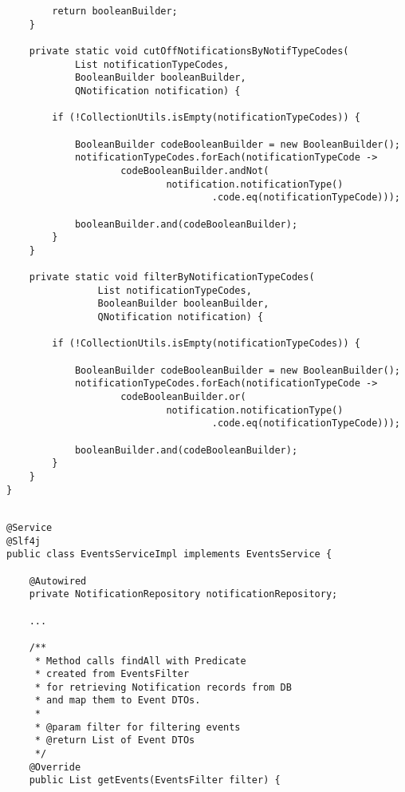 \documentclass[twoside, 12pt]{article}
\begin{document}
{{\begin{lstlisting}
        return booleanBuilder;
    }

    private static void cutOffNotificationsByNotifTypeCodes(
            List notificationTypeCodes,
            BooleanBuilder booleanBuilder,
            QNotification notification) {

        if (!CollectionUtils.isEmpty(notificationTypeCodes)) {

            BooleanBuilder codeBooleanBuilder = new BooleanBuilder();
            notificationTypeCodes.forEach(notificationTypeCode ->
                    codeBooleanBuilder.andNot(
                            notification.notificationType()
                                    .code.eq(notificationTypeCode)));

            booleanBuilder.and(codeBooleanBuilder);
        }
    }

    private static void filterByNotificationTypeCodes(
                List notificationTypeCodes,
                BooleanBuilder booleanBuilder,
                QNotification notification) {

        if (!CollectionUtils.isEmpty(notificationTypeCodes)) {

            BooleanBuilder codeBooleanBuilder = new BooleanBuilder();
            notificationTypeCodes.forEach(notificationTypeCode ->
                    codeBooleanBuilder.or(
                            notification.notificationType()
                                    .code.eq(notificationTypeCode)));

            booleanBuilder.and(codeBooleanBuilder);
        }
    }
}
\end{lstlisting}

\clearpage


\begin{lstlisting}

@Service
@Slf4j
public class EventsServiceImpl implements EventsService {

    @Autowired
    private NotificationRepository notificationRepository;

    ...

    /**
     * Method calls findAll with Predicate
     * created from EventsFilter
     * for retrieving Notification records from DB
     * and map them to Event DTOs.
     *
     * @param filter for filtering events
     * @return List of Event DTOs
     */
    @Override
    public List getEvents(EventsFilter filter) {


\end{lstlisting}}}
\end{document}
